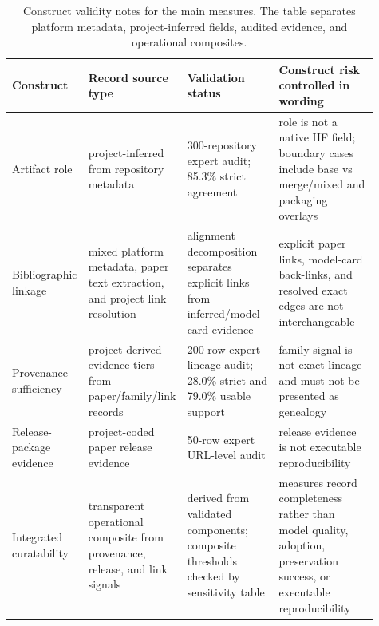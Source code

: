 \begin{table}[t]
\centering
\caption{Construct validity notes for the main measures. The table separates platform metadata, project-inferred fields, audited evidence, and operational composites.}
\label{tab:construct-validity}
\small
\begin{tabular}{p{0.17\linewidth}p{0.22\linewidth}p{0.25\linewidth}p{0.27\linewidth}}
\toprule
Construct & Record source type & Validation status & Construct risk controlled in wording \\
\midrule
Artifact role & project-inferred from repository metadata & 300-repository expert audit; 85.3\% strict agreement & role is not a native HF field; boundary cases include base vs merge/mixed and packaging overlays \\
Bibliographic linkage & mixed platform metadata, paper text extraction, and project link resolution & alignment decomposition separates explicit links from inferred/model-card evidence & explicit paper links, model-card back-links, and resolved exact edges are not interchangeable \\
Provenance sufficiency & project-derived evidence tiers from paper/family/link records & 200-row expert lineage audit; 28.0\% strict and 79.0\% usable support & family signal is not exact lineage and must not be presented as genealogy \\
Release-package evidence & project-coded paper release evidence & 50-row expert URL-level audit & release evidence is not executable reproducibility \\
Integrated curatability & transparent operational composite from provenance, release, and link signals & derived from validated components; composite thresholds checked by sensitivity table & measures record completeness rather than model quality, adoption, preservation success, or executable reproducibility \\
\bottomrule
\end{tabular}
\end{table}
